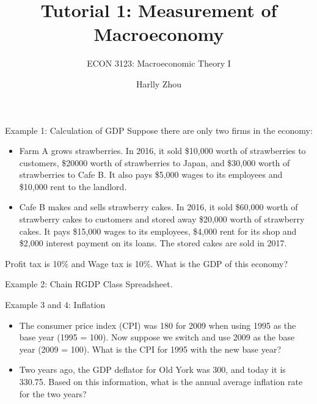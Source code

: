 \documentclass[xcolor=dvipsnames, aspectratio=1610]{beamer}
\title[Measurment of Macroeconomy]{Tutorial 1: Measurement of Macroeconomy}
\subtitle{ECON 3123: Macroeconomic Theory I}
\author[Harlly Zhou]{Harlly Zhou}
\institute[HKUST]{Department of Economics\\
HKUST Business School}
\date{}
\begin{document}
\begin{frame}
\titlepage
\end{frame}

\begin{frame}{Example 1: Calculation of GDP}
    Suppose there are only two firms in the economy:
    \begin{itemize}
        \item Farm A grows strawberries. In 2016, it sold \$10,000 worth of strawberries to customers, \$20000 worth of strawberries to Japan, and \$30,000 worth of strawberries to Cafe B. It also pays \$5,000 wages to its employees and \$10,000 rent to the landlord.
        \item Cafe B makes and sells strawberry cakes. In 2016, it sold \$60,000 worth of strawberry cakes to customers and stored away \$20,000 worth of strawberry cakes. It pays \$15,000 wages to its employees, \$4,000 rent for its shop and \$2,000 interest payment on its loans. The stored cakes are sold in 2017.
    \end{itemize}
    Profit tax is 10\% and Wage tax is 10\%. What is the GDP of this economy?
\end{frame}

\begin{frame}{Example 2: Chain RGDP}
    Class Spreadsheet.
\end{frame}

\begin{frame}{Example 3 and 4: Inflation}
    \begin{itemize}
        \item The consumer price index (CPI) was 180 for 2009 when using 1995 as the base year (1995 = 100). Now suppose we switch and use 2009 as the base year (2009 = 100). What is the CPI for 1995 with the new base year?
        \vspace{36pt}
        \item Two years ago, the GDP deflator for Old York was 300, and today it is 330.75. Based on this information, what is the annual average inflation rate for the two years?
    \end{itemize}
\end{frame}
\end{document}
